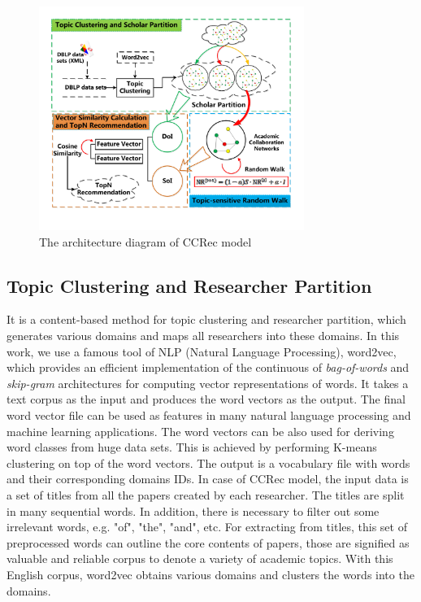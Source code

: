 \documentclass{acm_proc_article-sp}
\begin{document}

\begin{figure}
\centering
\includegraphics [width=3.4in]{Fig1.pdf}
\caption{The architecture diagram of CCRec model}
\end{figure}

\subsection{Topic Clustering and Researcher Partition}
It is a content-based method for topic clustering and researcher partition, which generates various domains and maps all researchers into these domains. In this work, we use a famous tool of NLP (Natural Language Processing), word2vec, which provides an efficient implementation of the continuous of \emph{bag-of-words} and \emph{skip-gram} architectures for computing vector representations of words. It takes a text corpus as the input and produces the word vectors as the output. The final word vector file can be used as features in many natural language processing and machine learning applications. The word vectors can be also used for deriving word classes from huge data sets. This is achieved by performing K-means clustering on top of the word vectors. The output is a vocabulary file with words and their corresponding domains IDs. In case of CCRec model, the input data is a set of titles from all the papers created by each researcher. The titles are split in many sequential words. In addition, there is necessary to filter out some irrelevant words, e.g. "of", "the", "and", etc. For extracting from titles, this set of preprocessed words can outline the core contents of papers, those are signified as valuable and reliable corpus to denote a variety of academic topics. With this English corpus, word2vec obtains various domains and clusters the words into the domains.
\end{document}
